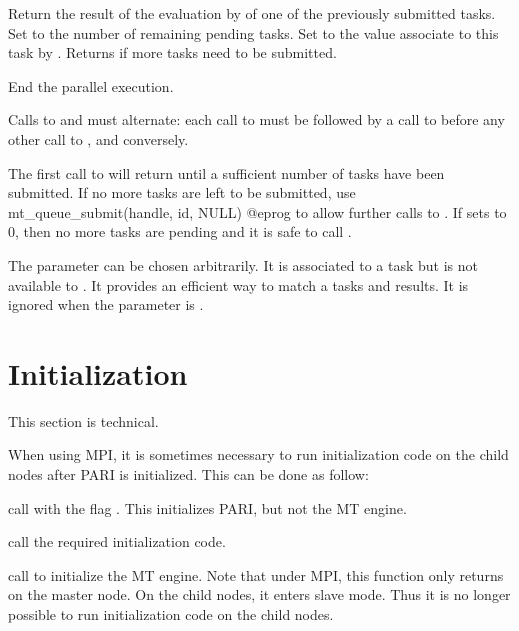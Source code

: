 Return the result of the evaluation by  of one of the previously
submitted tasks. Set  to the number of remaining pending tasks.
Set  to the value associate to this task by
.  Returns  if more tasks need to be
submitted.

 End the parallel execution.

Calls to  and  must alternate: each
call to  must be followed by a call to
 before any other call to ,
and conversely.

The first call to  will return  until a
sufficient number of tasks have been submitted. If no more tasks are left
to be submitted, use
\bprog
  mt_queue_submit(handle, id, NULL)
@eprog\noindent
to allow further calls to .  If  sets
 to $0$, then no more tasks are pending and it is safe to call
.

The parameter  can be chosen arbitrarily. It is associated to a
task but is not available to .  It provides an efficient way to
match a tasks and results. It is ignored when the parameter  is
.

\section{Initialization}

This section is technical.

 \label{pari_mt_init}
When using MPI, it is sometimes necessary to run initialization code on the
child nodes after PARI is initialized. This can be done as follow:

\item call  with the flag .
This initializes PARI, but not the MT engine.

\item call the required initialization code.

\item call  to initialize the MT engine.
Note that under MPI, this function only returns on the master node. On the
child nodes, it enters slave mode. Thus it is no longer possible to run
initialization code on the child nodes.

